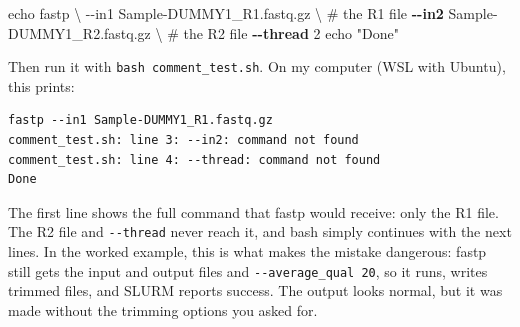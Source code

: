 \documentclass[
  letterpaper,
  DIV=11,
  numbers=noendperiod]{scrreprt}
\newenvironment{Shaded}{}{}
\newcommand{\AttributeTok}[1]{\textcolor[rgb]{0.84,0.23,0.29}{#1}}
\newcommand{\BuiltInTok}[1]{\textcolor[rgb]{0.84,0.23,0.29}{#1}}
\newcommand{\CommentTok}[1]{\textcolor[rgb]{0.42,0.45,0.49}{#1}}
\newcommand{\DataTypeTok}[1]{\textcolor[rgb]{0.84,0.23,0.29}{#1}}
\newcommand{\ExtensionTok}[1]{\textcolor[rgb]{0.84,0.23,0.29}{\textbf{#1}}}
\newcommand{\NormalTok}[1]{\textcolor[rgb]{0.14,0.16,0.18}{#1}}
\newcommand{\StringTok}[1]{\textcolor[rgb]{0.01,0.18,0.38}{#1}}
\begin{document}
\begin{Shaded}
\begin{Highlighting}[]
\BuiltInTok{echo}\NormalTok{ fastp }\DataTypeTok{\textbackslash{}}
    \AttributeTok{{-}{-}in1}\NormalTok{ Sample{-}DUMMY1\_R1.fastq.gz }\DataTypeTok{\textbackslash{} }  \CommentTok{\# the R1 file}
    \ExtensionTok{{-}{-}in2}\NormalTok{ Sample{-}DUMMY1\_R2.fastq.gz }\DataTypeTok{\textbackslash{} }  \CommentTok{\# the R2 file}
    \ExtensionTok{{-}{-}thread}\NormalTok{ 2}
\BuiltInTok{echo} \StringTok{"Done"}
\end{Highlighting}
\end{Shaded}

Then run it with \texttt{bash\ comment\_test.sh}. On my computer (WSL
with Ubuntu), this prints:

\begin{verbatim}
fastp --in1 Sample-DUMMY1_R1.fastq.gz
comment_test.sh: line 3: --in2: command not found
comment_test.sh: line 4: --thread: command not found
Done
\end{verbatim}

The first line shows the full command that fastp would receive: only the
R1 file. The R2 file and \texttt{-\/-thread} never reach it, and bash
simply continues with the next lines. In the worked example, this is
what makes the mistake dangerous: fastp still gets the input and output
files and \texttt{-\/-average\_qual\ 20}, so it runs, writes trimmed
files, and SLURM reports success. The output looks normal, but it was
made without the trimming options you asked for.
\end{document}

